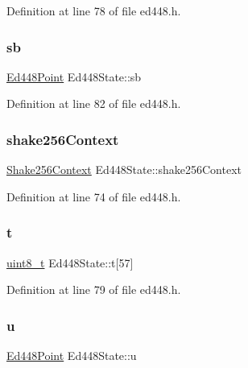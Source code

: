Definition at line 78 of file ed448.\+h.

\mbox{\label{structEd448State_a261c5effb4cc26327eb1d480be635ebb}} 
\subsubsection{\texorpdfstring{sb}{sb}}
{\footnotesize\ttfamily \hyperlink{structEd448Point}{Ed448\+Point} Ed448\+State\+::sb}



Definition at line 82 of file ed448.\+h.

\mbox{\label{structEd448State_a80b6a03936367779610c7ec1f2cc27ad}} 
\subsubsection{\texorpdfstring{shake256\+Context}{shake256Context}}
{\footnotesize\ttfamily \hyperlink{shake256_8h_a7c3af3f5a8bde59eb933705252280fff}{Shake256\+Context} Ed448\+State\+::shake256\+Context}



Definition at line 74 of file ed448.\+h.

\mbox{\label{structEd448State_a013f38fceb014e0929a015410ea960f0}} 
\subsubsection{\texorpdfstring{t}{t}}
{\footnotesize\ttfamily \hyperlink{stdint_8h_aba7bc1797add20fe3efdf37ced1182c5}{uint8\+\_\+t} Ed448\+State\+::t\mbox{[}57\mbox{]}}



Definition at line 79 of file ed448.\+h.

\mbox{\label{structEd448State_a8b01461b3a9860a1e729c976b783ea77}} 
\subsubsection{\texorpdfstring{u}{u}}
{\footnotesize\ttfamily \hyperlink{structEd448Point}{Ed448\+Point} Ed448\+State\+::u}




